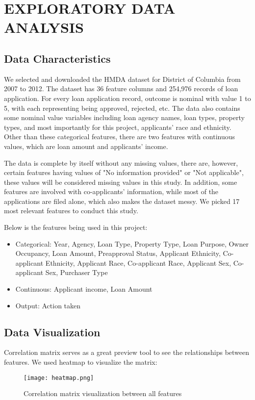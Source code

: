 \documentclass[letterpaper, 10 pt, conference]{ieeeconf}  %
\begin{document}
\section{EXPLORATORY DATA ANALYSIS}
\subsection{Data Characteristics}
We selected and downloaded the HMDA dataset for District of Columbia from 2007 to 2012. The dataset has 36 feature columns and 254,976 records of loan application. For every loan application record, outcome is nominal with value 1 to 5, with each representing being approved, rejected, etc. The data also contains some nominal value variables including loan agency names, loan types, property types, and most importantly for this project, applicants' race and ethnicity. Other than these categorical features, there are two features with continuous values, which are loan amount and applicants' income. 

The data is complete by itself without any missing values, there are, however, certain features having values of "No information provided" or "Not applicable", these values will be considered missing values in this study. In addition, some features are involved with co-applicants' information, while most of the applications are filed alone, which also makes the dataset messy. We picked 17 most relevant features to conduct this study.

Below is the features being used in this project:
\begin{itemize}

\item Categorical: Year, Agency, Loan Type, Property Type, Loan Purpose, Owner Occupancy, Loan Amount, Preapproval Status, Applicant Ethnicity, Co-applicant Ethnicity, Applicant Race, Co-applicant Race, Applicant Sex, Co-applicant Sex, Purchaser Type
\item Continuous: Applicant income, Loan Amount
\item Output: Action taken

\end{itemize}
\subsection{Data Visualization}
Correlation matrix serves as a great preview tool to see the relationships between features. We used heatmap to visualize the matrix:
\begin{figure}[h]
    \centering
    \texttt{[image: heatmap.png]}
    \caption{Correlation matrix visualization between all features}
    \label{fig:mesh2}
\end{figure}
\end{document}
